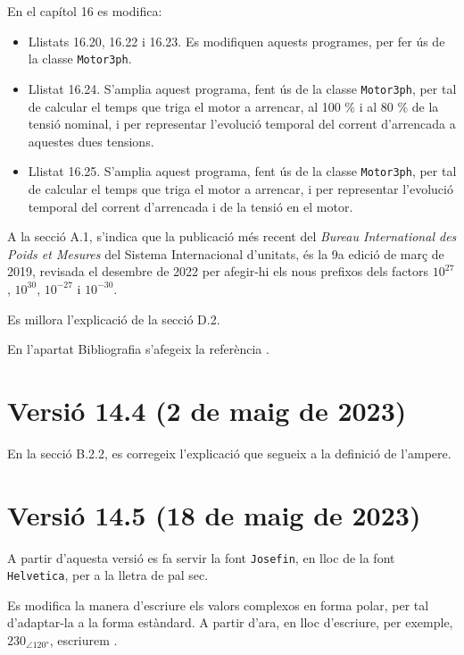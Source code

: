 En el capítol 16 es modifica:
\begin{itemize}
	\item Llistats 16.20, 16.22 i 16.23. Es modifiquen aquests programes, per fer ús de la classe \texttt{Motor3ph}.
	\item Llistat 16.24. S'amplia aquest programa, fent ús de la classe \texttt{Motor3ph}, per tal de calcular el temps que triga el motor a arrencar, al 100 \% i al 80 \% de la tensió nominal, i per representar l'evolució temporal del corrent d'arrencada a aquestes dues tensions.	
	\item  Llistat 16.25. S'amplia aquest programa, fent ús de la classe \texttt{Motor3ph}, per tal de calcular el temps que triga el motor a arrencar, i per representar l'evolució temporal del  corrent d'arrencada i de la tensió en el motor.
\end{itemize}

A la secció A.1, s'indica que la publicació més recent del \textit{Bureau 	International des Poids et Mesures} del Sistema Internacional d'unitats, és la  9a edició de març de 2019, revisada el desembre de 2022 per afegir-hi els nous prefixos dels factors $10^{27}$,  $10^{30}$,  $10^{-27}$ i  $10^{-30}$.

Es millora l'explicació de la secció D.2.

En l'apartat Bibliografia s'afegeix la referència \cite{ALL}.

\section*{Versió 14.4 (2 de maig de 2023)}

En la secció B.2.2, es corregeix l'explicació que segueix a la definició de l'ampere.

\section*{Versió 14.5 (18 de maig de 2023)}

A partir d'aquesta versió es fa servir la font \texttt{Josefin}, en lloc de la font \texttt{Helvetica},  per a la lletra de pal sec.

Es modifica  la manera d'escriure els valors complexos en forma polar, per tal d'adaptar-la a la forma estàndard. A partir d'ara, en lloc d'escriure, per exemple, $230_{\angle\ang{120}}$, escriurem .

